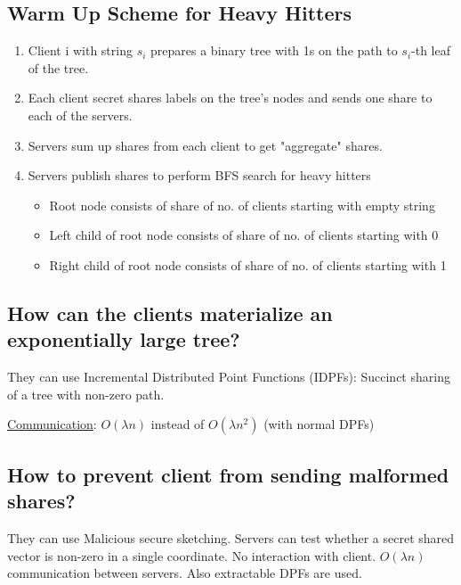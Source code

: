 \subsection{Warm Up Scheme for Heavy Hitters}
\begin{enumerate}
    \item Client i with string $s_i$ prepares a binary tree with 1s on the path to $s_i$-th leaf of the tree.
    \item Each client secret shares labels on the tree's nodes and sends one share to each of the servers. 
    \item Servers sum up shares from each client to get "aggregate" shares.
    \item Servers publish shares to perform BFS search for heavy hitters
    \begin{itemize}
        \item Root node consists of share of no. of clients starting with empty string
        \item Left child of root node consists of share of no. of clients starting with 0
        \item Right child of root node consists of share of no. of clients starting with 1
    \end{itemize}
\end{enumerate}

\subsection{How can the clients materialize an exponentially large tree?}
They can use Incremental Distributed Point Functions (IDPFs): Succinct sharing of a tree with non-zero path.

\underline{Communication}: $O(\lambda n)$ instead of $O (\lambda n^2)$ (with normal DPFs)

\subsection{How to prevent client from sending malformed shares?}
They can use Malicious secure sketching. Servers can test whether a secret shared vector is non-zero in a single coordinate. No interaction with client. $O(\lambda n)$ communication between servers. Also extractable DPFs are used.




%
